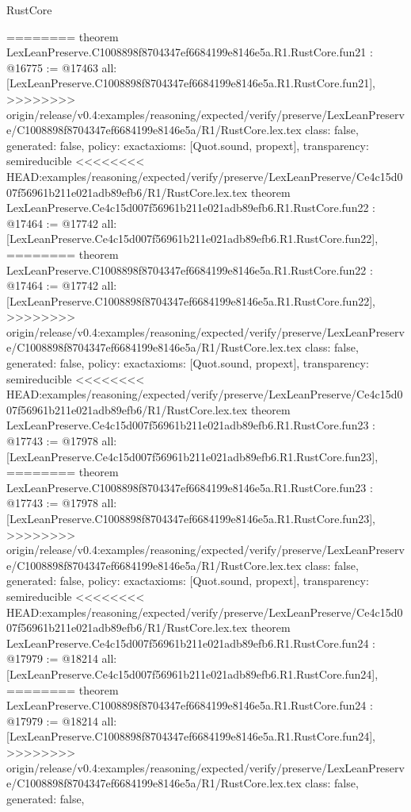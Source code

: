 \begin{lexlean}{RustCore}
\begin{coremodule}
{\begin{coremodule}
{{{{{{{{{{{{{{{{{{{{{{{{========
theorem LexLeanPreserve.C1008898f8704347ef6684199e8146e5a.R1.RustCore.fun21 : @16775 := @17463 {
  all: [LexLeanPreserve.C1008898f8704347ef6684199e8146e5a.R1.RustCore.fun21],
>>>>>>>> origin/release/v0.4:examples/reasoning/expected/verify/preserve/LexLeanPreserve/C1008898f8704347ef6684199e8146e5a/R1/RustCore.lex.tex
  class: false,
  generated: false,
  policy: exact{axioms: [Quot.sound, propext]},
  transparency: semireducible
}
<<<<<<<< HEAD:examples/reasoning/expected/verify/preserve/LexLeanPreserve/Ce4c15d007f56961b211e021adb89efb6/R1/RustCore.lex.tex
theorem LexLeanPreserve.Ce4c15d007f56961b211e021adb89efb6.R1.RustCore.fun22 : @17464 := @17742 {
  all: [LexLeanPreserve.Ce4c15d007f56961b211e021adb89efb6.R1.RustCore.fun22],
========
theorem LexLeanPreserve.C1008898f8704347ef6684199e8146e5a.R1.RustCore.fun22 : @17464 := @17742 {
  all: [LexLeanPreserve.C1008898f8704347ef6684199e8146e5a.R1.RustCore.fun22],
>>>>>>>> origin/release/v0.4:examples/reasoning/expected/verify/preserve/LexLeanPreserve/C1008898f8704347ef6684199e8146e5a/R1/RustCore.lex.tex
  class: false,
  generated: false,
  policy: exact{axioms: [Quot.sound, propext]},
  transparency: semireducible
}
<<<<<<<< HEAD:examples/reasoning/expected/verify/preserve/LexLeanPreserve/Ce4c15d007f56961b211e021adb89efb6/R1/RustCore.lex.tex
theorem LexLeanPreserve.Ce4c15d007f56961b211e021adb89efb6.R1.RustCore.fun23 : @17743 := @17978 {
  all: [LexLeanPreserve.Ce4c15d007f56961b211e021adb89efb6.R1.RustCore.fun23],
========
theorem LexLeanPreserve.C1008898f8704347ef6684199e8146e5a.R1.RustCore.fun23 : @17743 := @17978 {
  all: [LexLeanPreserve.C1008898f8704347ef6684199e8146e5a.R1.RustCore.fun23],
>>>>>>>> origin/release/v0.4:examples/reasoning/expected/verify/preserve/LexLeanPreserve/C1008898f8704347ef6684199e8146e5a/R1/RustCore.lex.tex
  class: false,
  generated: false,
  policy: exact{axioms: [Quot.sound, propext]},
  transparency: semireducible
}
<<<<<<<< HEAD:examples/reasoning/expected/verify/preserve/LexLeanPreserve/Ce4c15d007f56961b211e021adb89efb6/R1/RustCore.lex.tex
theorem LexLeanPreserve.Ce4c15d007f56961b211e021adb89efb6.R1.RustCore.fun24 : @17979 := @18214 {
  all: [LexLeanPreserve.Ce4c15d007f56961b211e021adb89efb6.R1.RustCore.fun24],
========
theorem LexLeanPreserve.C1008898f8704347ef6684199e8146e5a.R1.RustCore.fun24 : @17979 := @18214 {
  all: [LexLeanPreserve.C1008898f8704347ef6684199e8146e5a.R1.RustCore.fun24],
>>>>>>>> origin/release/v0.4:examples/reasoning/expected/verify/preserve/LexLeanPreserve/C1008898f8704347ef6684199e8146e5a/R1/RustCore.lex.tex
  class: false,
  generated: false,
}}}}}}}}}}}}}}}}}}}}}}}}}}}}
\end{coremodule}}
\end{coremodule}
\end{lexlean}

